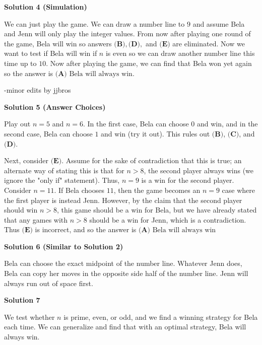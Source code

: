 \begin{enumerate}
 



\textbf{Solution 4 (Simulation)}

We can just play the game. We can draw a number line to $9$ and assume Bela and Jenn will only play the integer values. From now after playing one round of the game, Bela will win so answers $\textbf{(B)},\textbf{(D)},$ and $\textbf{(E)}$ are eliminated. Now we want to test if Bela will win if $n$ is even so we can draw another number line this time up to $10$. Now after playing the game, we can find that Bela won yet again so the answer is $\boxed{\textbf{(A)} \text{ Bela will always win}}.$

 -minor edits by jjbros

 



\textbf{Solution 5 (Answer Choices)}

Play out $n=5$ and $n=6$. In the first case, Bela can choose $0$ and win, and in the second case, Bela can choose $1$ and win (try it out). This rules out $\textbf{(B)}$, $\textbf{(C)}$, and $\textbf{(D)}$.

 Next, consider $\textbf{(E)}$. Assume for the sake of contradiction that this is true; an alternate way of stating this is that for $n>8$, the second player always wins (we ignore the "only if" statement). Thus, $n=9$ is a win for the second player. Consider $n=11$. If Bela chooses $11$, then the game becomes an $n=9$ case where the first player is instead Jenn. However, by the claim that the second player should win $n>8$, this game should be a win for Bela, but we have already stated that any games with $n>8$ should be a win for Jenn, which is a contradiction. Thus $\textbf{(E)}$ is incorrect, and so the answer is $\boxed{\textbf{(A)} \text{ Bela will always win}}$




\textbf{Solution 6 (Similar to Solution 2)}

Bela can choose the exact midpoint of the number line. Whatever Jenn does, Bela can copy her moves in the opposite side half of the number line. Jenn will always run out of space first.

 



\textbf{Solution 7}

We test whether $n$ is prime, even, or odd, and we find a winning strategy for Bela each time. We can generalize and find that with an optimal strategy, Bela will always win.


\end{enumerate}
